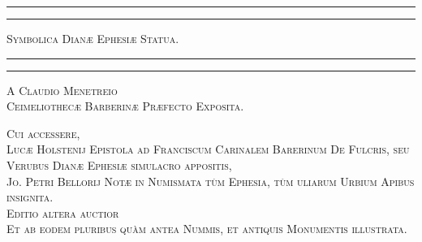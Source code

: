 \documentclass[a4paper, 11pt, oneside, polutonikogreek, latin]{article}
\begin{document}
\renewcommand{\thefigure}{\Fontauri{\arabic{figure}}}
\renewcommand\thefootnote{\Fontauri{\arabic{footnote}}}
\let\oldfootnote\footnote
    \renewcommand{\footnote}[1]{\oldfootnote{\Fontauri\large#1}}
\begin{titlepage} %
	\centering %

	
	\rule{\textwidth}{1.6pt}\vspace*{-\baselineskip}\vspace*{2pt} %
	\rule{\textwidth}{0.4pt} %
	
	\vspace{1\baselineskip} %
	
	{\scshape\Huge Symbolica Dianæ Ephesiæ Statua.}
	
	\vspace{1\baselineskip} %

	\rule{\textwidth}{0.4pt}\vspace*{-\baselineskip}\vspace{3.2pt} %
	\rule{\textwidth}{1.6pt} %
	
	\vspace{1\baselineskip} %
	
	
	{\scshape \Large A Claudio Menetreio\\Ceimeliothecæ Barberinæ Præfecto Exposita.} %
	
	\vspace*{1\baselineskip} %
	
{\scshape Cui accessere,\\Lucæ Holstenij Epistola ad Franciscum Carinalem Barerinum De Fulcris, seu Verubus Dianæ Ephesiæ simulacro appositis,\\Jo. Petri Bellorij Notæ in Numismata tùm Ephesia, tùm uliarum Urbium Apibus insignita.\\\vspace*{10mm}\small Editio altera auctior\\Et ab eodem pluribus quàm antea Nummis, et antiquis Monumentis illustrata.} %


\end{titlepage}
\end{document}
